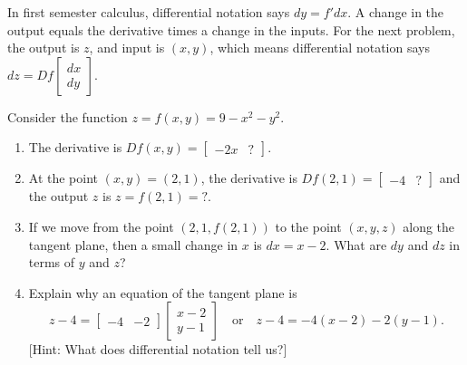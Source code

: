 In first semester calculus, differential notation says $dy=f' dx$. A change in the output equals the derivative times a change in the inputs.  For the next problem, the output is $z$, and input is $(x,y)$, which means differential notation says $dz = Df \begin{bmatrix}dx\\dy\end{bmatrix}$.  

\begin{problem}\label{prob:tangent plane downbowl}%
		
 
Consider the function $z=f(x,y)=9-x^2-y^2$. 
\begin{enumerate}
	\item The derivative is $Df(x,y) = \begin{bmatrix}-2x&?\end{bmatrix}$. 
	\item At the point $(x,y)=(2,1)$, the derivative is $Df(2,1) = \begin{bmatrix}-4&?\end{bmatrix}$ and the output $z$ is $z=f(2,1)=?$.
	\item If we move from the point $(2,1,f(2,1))$ to the point $(x,y,z)$ along the tangent plane, then a small change in $x$ is $dx=x-2$. What are $dy$ and $dz$ in terms of $y$ and $z$?
	\item Explain why an equation of the tangent plane is 
$$
z-4=\begin{bmatrix}-4 & -2 \end{bmatrix}\begin{bmatrix}x-2\\y-1\end{bmatrix} 
\quad \text{or}\quad 
z-4=-4(x-2)-2(y-1).$$ [Hint: What does differential notation tell us?]
\end{enumerate}
\end{problem}

